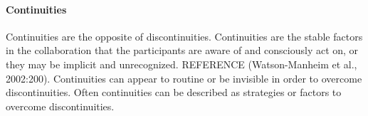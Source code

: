 \paragraph{Continuities} \label{par:continuities}
Continuities are the opposite of discontinuities. Continuities are the stable factors in the collaboration that the participants are aware of and consciously act on, or they may be implicit and 
unrecognized. REFERENCE (Watson-Manheim et al., 2002:200). Continuities can appear to routine or be invisible in order to overcome discontinuities. Often continuities can be described as strategies or factors to overcome discontinuities.
